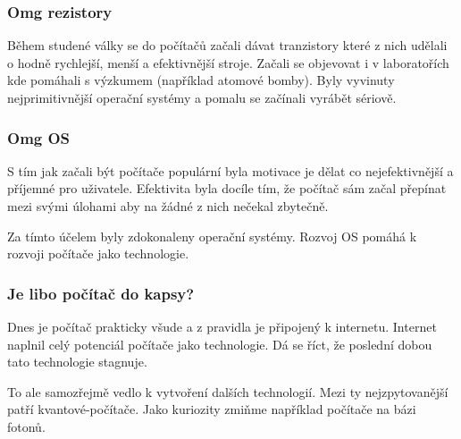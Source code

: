 \documentclass{beamer}
\begin{document}
\begin{frame}
 \frametitle{Omg rezistory}
 Během studené války se do počítačů začali dávat tranzistory které z nich
 udělali o hodně rychlejší, menší a efektivnější stroje. Začali se objevovat i v
 laboratořích kde pomáhali s výzkumem (například atomové bomby).
\vfill
 Byly vyvinuty nejprimitivnější operační systémy a pomalu se začínali vyrábět
 sériově.
\end{frame}
\begin{frame}
 \frametitle{Omg OS}
 S tím jak začali být počítače populární byla motivace je dělat co
 nejefektivnější a příjemné pro uživatele. Efektivita byla docíle tím, že
 počítač sám začal přepínat mezi svými úlohami aby na žádné z nich nečekal
 zbytečně.

 \vfill
 Za tímto účelem byly zdokonaleny operační systémy. Rozvoj OS pomáhá k rozvoji
 počítače jako technologie.
\end{frame}
\begin{frame}
 \frametitle{Je libo počítač do kapsy?}
 Dnes je počítač prakticky všude a z pravidla je připojený k internetu. Internet
 naplnil celý potenciál počítače jako technologie. Dá se říct, že poslední dobou
 tato technologie stagnuje.

 \vfill
To ale samozřejmě vedlo k vytvoření dalších technologií. Mezi ty nejzpytovanější
patří kvantové-počítače. Jako kuriozity zmiňme například počítače na bázi
fotonů.
\end{frame}
\end{document}

